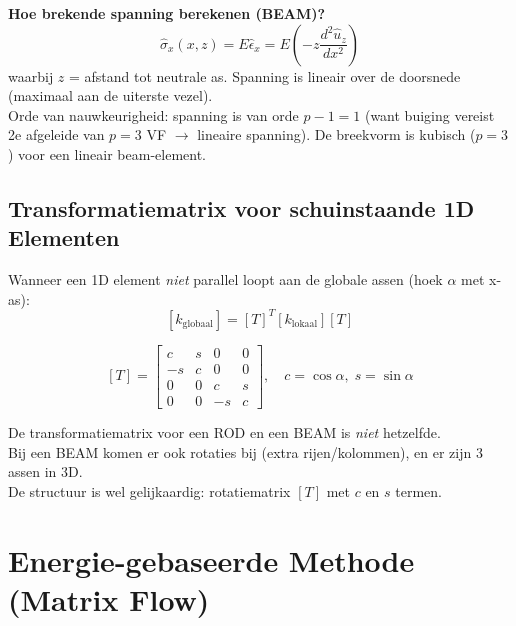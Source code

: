\documentclass[a4paper,10pt]{article}
\begin{document}
\textbf{Hoe brekende spanning berekenen (BEAM)?}
\[
  \hat{\sigma}_x(x,z) = E\hat{\epsilon}_x = E\left(-z\frac{d^2\hat{u}_z}{dx^2}\right)
\]
waarbij $z$ = afstand tot neutrale as. Spanning is lineair over de doorsnede (maximaal aan de uiterste vezel).\\
Orde van nauwkeurigheid: spanning is van orde $p-1 = 1$ (want buiging vereist 2e afgeleide van $p=3$ VF $\to$ lineaire spanning). De breekvorm is kubisch ($p=3$) voor een lineair beam-element.

\subsection*{Transformatiematrix voor schuinstaande 1D Elementen}

Wanneer een 1D element \emph{niet} parallel loopt aan de globale assen (hoek $\alpha$ met x-as):
\[
  [k_{\text{globaal}}] = [T]^T [k_{\text{lokaal}}] [T]
\]

\begin{formulebox}
\[
  [T] = \begin{bmatrix} c & s & 0 & 0 \\ -s & c & 0 & 0 \\ 0 & 0 & c & s \\ 0 & 0 & -s & c \end{bmatrix}, \quad c = \cos\alpha,\; s = \sin\alpha
\]
\end{formulebox}

\begin{exambox}
De transformatiematrix voor een ROD en een BEAM is \emph{niet} hetzelfde.\\
Bij een BEAM komen er ook rotaties bij (extra rijen/kolommen), en er zijn 3 assen in 3D.\\
De structuur is wel gelijkaardig: rotatiematrix $[T]$ met $c$ en $s$ termen.
\end{exambox}

\section{Energie-gebaseerde Methode (Matrix Flow)}
\end{document}
